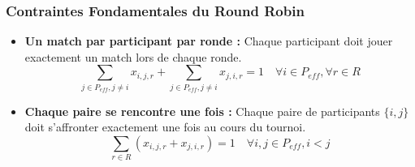 \documentclass[11pt, a4paper]{article}
\begin{document}
\subsubsection{Contraintes Fondamentales du Round Robin}
\begin{itemize}
    \item \textbf{Un match par participant par ronde :} Chaque participant doit jouer exactement un match lors de chaque ronde.
    \begin{equation}
        \sum_{j \in P_{eff}, j \neq i} x_{i,j,r} + \sum_{j \in P_{eff}, j \neq i} x_{j,i,r} = 1 \quad \forall i \in P_{eff}, \forall r \in R
    \end{equation}
    \item \textbf{Chaque paire se rencontre une fois :} Chaque paire de participants $\{i, j\}$ doit s'affronter exactement une fois au cours du tournoi.
    \begin{equation}
        \sum_{r \in R} (x_{i,j,r} + x_{j,i,r}) = 1 \quad \forall i, j \in P_{eff}, i < j
    \end{equation}
\end{itemize}
\end{document}
